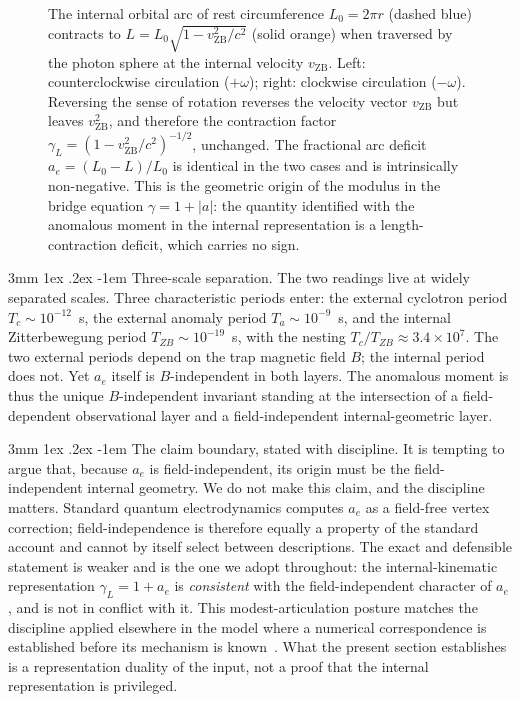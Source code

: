 \documentclass[%
 reprint, amsmath,amssymb, aps, prb, ]{revtex4-2}
\makeatletter
\numberwithin{equation}{section}
\renewcommand\paragraph{%
  \@startsection{paragraph}{4}{\z@}%
    {3mm \@plus 1ex \@minus .2ex}%
    {-1em}%
    {\normalfont\normalsize\itshape}}
\newcommand{\vZB}{v_{\text{ZB}}}
\newcommand{\gammaL}{\gamma_{L}}
\makeatother
\begin{document}
\begin{figure}[t!]
\label{fig:arc_modulus}
\vspace{0.4em}
\begin{minipage}{0.95\textwidth}
\justifying\small
The internal orbital arc of rest circumference $L_0 = 2\pi r$ (dashed blue) contracts to $L = L_0\sqrt{1-\vZB^2/c^2}$ (solid orange) when traversed by the photon sphere at the internal velocity $\vZB$. Left: counterclockwise circulation ($+\omega$); right: clockwise circulation ($-\omega$). Reversing the sense of rotation reverses the velocity vector $\vZB$ but leaves $\vZB^2$, and therefore the contraction factor $\gammaL = (1-\vZB^2/c^2)^{-1/2}$, unchanged. The fractional arc deficit $a_e = (L_0-L)/L_0$ is identical in the two cases and is intrinsically non-negative. This is the geometric origin of the modulus in the bridge equation $\gamma = 1 + \lvert a\rvert$: the quantity identified with the anomalous moment in the internal representation is a length-contraction deficit, which carries no sign.
\end{minipage}
\end{figure}

\paragraph{Three-scale separation.}
The two readings live at widely separated scales. Three characteristic periods enter: the external cyclotron period $T_c \sim 10^{-12}$~s, the external anomaly period $T_a \sim 10^{-9}$~s, and the internal Zitterbewegung period $T_{ZB} \sim 10^{-19}$~s, with the nesting $T_c/T_{ZB} \approx 3.4\times10^{7}$. The two external periods depend on the trap magnetic field $B$; the internal period does not. Yet $a_e$ itself is $B$-independent in both layers. The anomalous moment is thus the unique $B$-independent invariant standing at the intersection of a field-dependent observational layer and a field-independent internal-geometric layer.

\paragraph{The claim boundary, stated with discipline.}
It is tempting to argue that, because $a_e$ is field-independent, its origin must be the field-independent internal geometry. We do not make this claim, and the discipline matters. Standard quantum electrodynamics computes $a_e$ as a field-free vertex correction; field-independence is therefore equally a property of the standard account and cannot by itself select between descriptions. The exact and defensible statement is weaker and is the one we adopt throughout: the internal-kinematic representation $\gamma_L = 1 + a_e$ is \emph{consistent} with the field-independent character of $a_e$, and is not in conflict with it. This modest-articulation posture matches the discipline applied elsewhere in the model where a numerical correspondence is established before its mechanism is known~\cite{hanamura28}. What the present section establishes is a representation duality of the input, not a proof that the internal representation is privileged.
\end{document}
